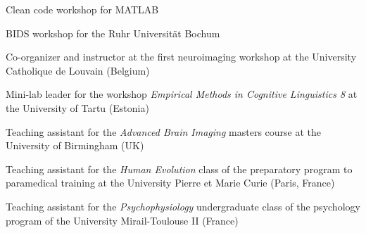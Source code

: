 Clean code workshop for MATLAB

BIDS workshop for the Ruhr Universität Bochum


Co-organizer and instructor at the first neuroimaging workshop
at the University Catholique de Louvain (Belgium)

Mini-lab leader for the workshop \textit{Empirical Methods in Cognitive Linguistics 8}
at the University of Tartu (Estonia)

Teaching assistant for the \textit{Advanced Brain Imaging} masters course
at the University of Birmingham (UK)

Teaching assistant for the \textit{Human Evolution} class of the preparatory program
to paramedical training at the University Pierre et Marie Curie (Paris, France)

Teaching assistant for the \textit{Psychophysiology} undergraduate class
of the psychology program of the University Mirail-Toulouse II (France)
